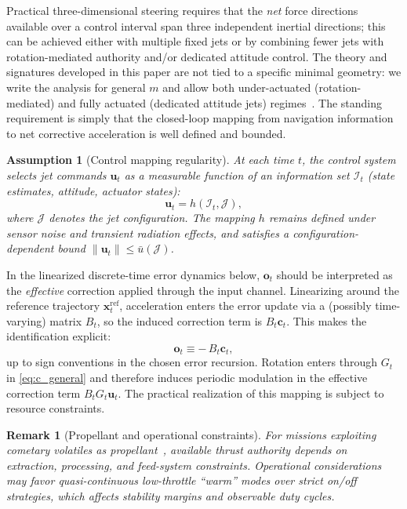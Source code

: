 \documentclass{article}
\newtheorem{remark}{Remark}
\newtheorem{assumption}{Assumption}
\begin{document}
Practical three-dimensional steering requires that the \emph{net} force directions available over a control interval span
three independent inertial directions; this can be achieved either with multiple fixed jets or by combining fewer jets with
rotation-mediated authority and/or dedicated attitude control. The theory and signatures developed in this paper are not tied
to a specific minimal geometry: we write the analysis for general $m$ and allow both under-actuated (rotation-mediated) and
fully actuated (dedicated attitude jets) regimes~\cite{wie2008spacecraft,markley2014fundamentals}. The standing requirement
is simply that the closed-loop mapping from navigation information to net corrective acceleration is well defined and bounded.

\begin{assumption}[Control mapping regularity]
\label{ass:h_regularity}
At each time $t$, the control system selects jet commands $\mathbf{u}_t$ as a measurable function of an information set
$\mathcal{I}_t$ (state estimates, attitude, actuator states):
\[
\mathbf{u}_t = h(\mathcal{I}_t,\mathcal{J}),
\]
where $\mathcal{J}$ denotes the jet configuration. The mapping $h$ remains defined under sensor noise and transient radiation effects,
and satisfies a configuration-dependent bound $\|\mathbf{u}_t\|\le \bar{u}(\mathcal{J})$.
\end{assumption}

In the linearized discrete-time error dynamics below, $\mathbf{o}_t$ should be interpreted as the \emph{effective} correction
applied through the input channel. Linearizing around the reference trajectory $\mathbf{x}^{\mathrm{ref}}_t$, acceleration enters
the error update via a (possibly time-varying) matrix $B_t$, so the induced correction term is $B_t\mathbf{c}_t$. This makes the
identification explicit:
\begin{equation}
\mathbf{o}_t \equiv -\,B_t \mathbf{c}_t,
\label{eq:o_from_c}
\end{equation}
up to sign conventions in the chosen error recursion. Rotation enters through $G_t$ in \eqref{eq:c_general} and therefore induces
periodic modulation in the effective correction term $B_tG_t\mathbf{u}_t$.
The practical realization of this mapping is subject to resource constraints.

\begin{remark}[Propellant and operational constraints]
\label{rem:propellant}
For missions exploiting cometary volatiles as propellant~\cite{mumma2011composition,altwegg2019rosina}, available thrust authority depends on extraction,
processing, and feed-system constraints. Operational considerations may favor quasi-continuous low-throttle ``warm'' modes over strict on/off strategies,
which affects stability margins and observable duty cycles.
\end{remark}
\end{document}
